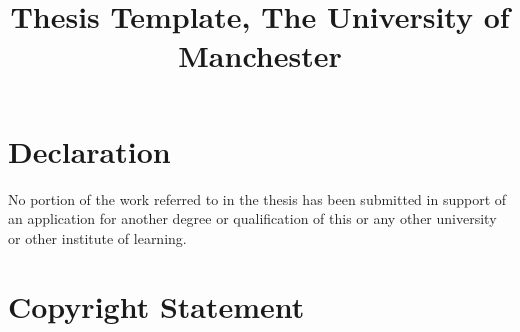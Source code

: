 \documentclass[11pt,oneside]{thesisformat}
\title{Thesis Template, The University of Manchester}
\begin{document}
\maketitle


\tableofcontents
\vfill
\begin{center}
\end{center}
\vfill

\listoftables


\listoffigures





\chapter*{Declaration}

No portion of the work referred to in the thesis has been submitted in support of an application for another degree or qualification of this or any other university or other institute of learning.


\chapter*{Copyright Statement}
\end{document}
